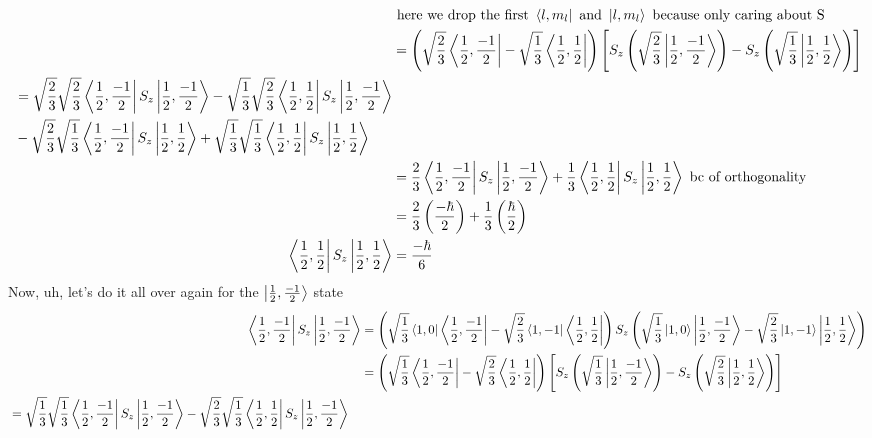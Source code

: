 \documentclass{article}
\begin{document}
\begin{enumerate}[label=\alph*)]
\begin{align*}
		&\text{ here we drop the first } \bra{l, m_l} \text{ and } \ket{l, m_l} \text{ because only caring about S}\\ 
		&= \left(\sqrt{\frac{2}{3}} \bra{\frac{1}{2}, \frac{-1}{2}} - \sqrt{\frac{1}{3}}\bra{\frac{1}{2}, \frac{1}{2}}\right) \left[ S_z\left(\sqrt{\frac{2}{3}} \ket{\frac{1}{2}, \frac{-1}{2}}\right) - S_z\left(\sqrt{\frac{1}{3}}\ket{\frac{1}{2}, \frac{1}{2}} \right) \right] \\
	\begin{split}
		&= \sqrt{\frac{2}{3}}\sqrt{\frac{2}{3}} \bra{\frac{1}{2}, \frac{-1}{2}}S_z\ket{\frac{1}{2}, \frac{-1}{2}} - \sqrt{\frac{1}{3}}\sqrt{\frac{2}{3}}\bra{\frac{1}{2}, \frac{1}{2}} S_z\ket{\frac{1}{2}, \frac{-1}{2}} 
		\\ &- \sqrt{\frac{2}{3}}\sqrt{\frac{1}{3}} \bra{\frac{1}{2}, \frac{-1}{2}}S_z\ket{\frac{1}{2}, \frac{1}{2}} + \sqrt{\frac{1}{3}}\sqrt{\frac{1}{3}}\bra{\frac{1}{2}, \frac{1}{2}} S_z\ket{\frac{1}{2}, \frac{1}{2}} 
	\end{split} \\
		&= \frac{2}{3} \bra{\frac{1}{2}, \frac{-1}{2}}S_z\ket{\frac{1}{2}, \frac{-1}{2}} + \frac{1}{3}\bra{\frac{1}{2}, \frac{1}{2}} S_z\ket{\frac{1}{2}, \frac{1}{2}} \text{ bc of orthogonality} \\
		&= \frac{2}{3}\left(\frac{-\hbar}{2}\right) + \frac{1}{3}\left(\frac{\hbar}{2}\right) \\ 
		\bra{\frac{1}{2},\frac{1}{2}}S_z\ket{\frac{1}{2},\frac{1}{2}} &= \frac{-\hbar}{6}
	\end{align*}
	Now, uh, let's do it all over again for the $\ket{\frac{1}{2},\frac{-1}{2}}$ state
	\begin{align*}
		\bra{\frac{1}{2},\frac{-1}{2}}S_z\ket{\frac{1}{2},\frac{-1}{2}} &= \left(\sqrt{\frac{1}{3}} \bra{1, 0}\bra{\frac{1}{2}, \frac{-1}{2}} - \sqrt{\frac{2}{3}}\bra{1, -1}\bra{\frac{1}{2}, \frac{1}{2}}\right)S_z \left(\sqrt{\frac{1}{3}} \ket{1, 0}\ket{\frac{1}{2}, \frac{-1}{2}} - \sqrt{\frac{2}{3}}\ket{1, -1}\ket{\frac{1}{2}, \frac{1}{2}} \right) \\
		&= \left(\sqrt{\frac{1}{3}} \bra{\frac{1}{2}, \frac{-1}{2}} - \sqrt{\frac{2}{3}}\bra{\frac{1}{2}, \frac{1}{2}}\right) \left[ S_z\left(\sqrt{\frac{1}{3}} \ket{\frac{1}{2}, \frac{-1}{2}}\right) - S_z\left(\sqrt{\frac{2}{3}}\ket{\frac{1}{2}, \frac{1}{2}} \right) \right] \\
	\begin{split}
		&= \sqrt{\frac{1}{3}}\sqrt{\frac{1}{3}} \bra{\frac{1}{2}, \frac{-1}{2}}S_z\ket{\frac{1}{2}, \frac{-1}{2}} - \sqrt{\frac{2}{3}}\sqrt{\frac{1}{3}}\bra{\frac{1}{2}, \frac{1}{2}} S_z\ket{\frac{1}{2}, \frac{-1}{2}} 

\end{split}
\end{align*}
\end{enumerate}
\end{document}
